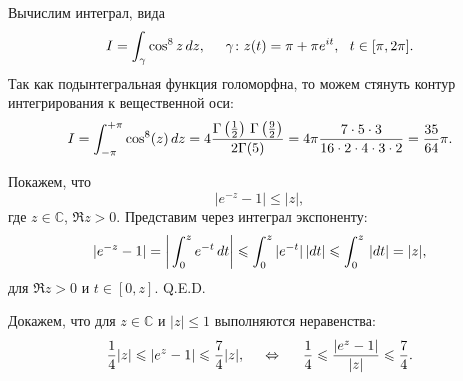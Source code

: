 
Вычислим интеграл, вида
\begin{equation*}
     I = \int_\gamma \cos^8 z \d z,
     \hspace{5 mm} 
     \gamma \colon  z(t) = \pi + \pi e^{i t}, \ \ t \in[\pi, 2 \pi].
\end{equation*}
Так как подынтегральная функция голоморфна, то можем стянуть контур интегрирования к вещественной оси:
\begin{equation*}
    I = \int_{-\pi}^{+\pi} \cos^8 (z) \d z = 4 \frac{\Gamma\left(\frac{1}{2}\right) \, \Gamma\left(\frac{9}{2}\right)}{2 \Gamma(5)} = 4 \pi \frac{7 \cdot 5 \cdot 3}{16 \cdot 2 \cdot 4 \cdot 3 \cdot 2} = \frac{35}{64}\pi.
\end{equation*}



Покажем, что 
\begin{equation*}
    |e^{-z} - 1| \leq |z|,
\end{equation*}
где $z \in \mathbb{C}$, $\Re z > 0$. Представим через интеграл экспоненту:
\begin{equation*}
    |e^{-z} - 1|  = 
    \bigg|
        \int_{0}^{z} e^{-t} \d t
    \bigg| \leq \int_{0}^{z} |e^{-t}| \, |dt| \leq \int_{0}^{z} \, |d t| = |z|,
\end{equation*}
для $\Re z > 0$ и $t \in [0, z]$. Q.E.D.





Докажем, что для $z \in \mathbb{C}$ и $|z| \leq 1$ выполняются неравенства:
\begin{equation*}
    \frac{1}{4} |z| \leq |e^z - 1| \leq \frac{7}{4}|z|,
    \hspace{5 mm} \Leftrightarrow \hspace{5 mm} 
    \frac{1}{4} \leq \frac{|e^z - 1|}{|z|}    \leq \frac{7}{4}.
\end{equation*}

